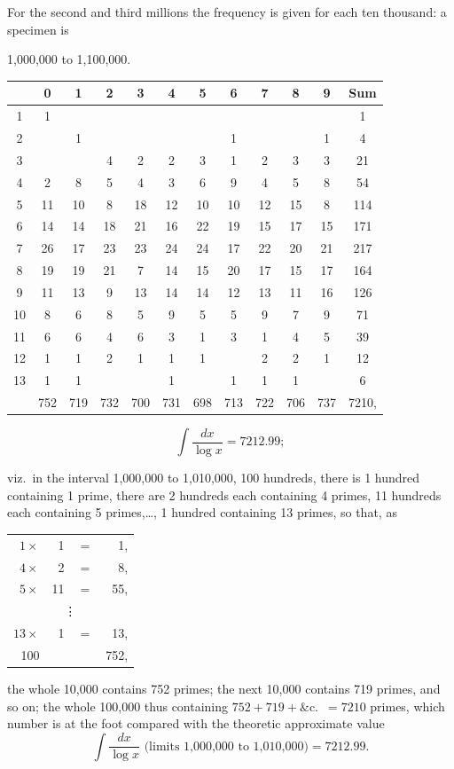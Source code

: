 \documentclass[11pt,a4paper]{article}
\begin{document}
For the second and third millions the frequency is given for each ten thousand: a specimen is
\begin{center}
1,000,000 to 1,100,000.
\end{center}
\begin{small}
\begin{center}
\begin{tabular}{c|cccccccccc|c}
 & 0 & 1 & 2 & 3 & 4 & 5 & 6 & 7 & 8 & 9 & Sum \\
\hline
1 & 1 & & & & & & & & & & 1 \\
2 & & 1 & & & & & 1 & & & 1 & 4 \\
3 & & & 4 & 2 & 2 & 3 & 1 & 2 & 3 & 3 & 21 \\
4 & 2 & 8 & 5 & 4 & 3 & 6 & 9 & 4 & 5 & 8 & 54 \\
5 & 11 & 10 & 8 & 18 & 12 & 10 & 10 & 12 & 15 & 8 & 114 \\
6 & 14 & 14 & 18 & 21 & 16 & 22 & 19 & 15 & 17 & 15 & 171 \\
7 & 26 & 17 & 23 & 23 & 24 & 24 & 17 & 22 & 20 & 21 & 217 \\
8 & 19 & 19 & 21 & 7 & 14 & 15 & 20 & 17 & 15 & 17 & 164 \\
9 & 11 & 13 & 9 & 13 & 14 & 14 & 12 & 13 & 11 & 16 & 126 \\
10 & 8 & 6 & 8 & 5 & 9 & 5 & 5 & 9 & 7 & 9 & 71 \\
11 & 6 & 6 & 4 & 6 & 3 & 1 & 3 & 1 & 4 & 5 & 39 \\
12 & 1 & 1 & 2 & 1 & 1 & 1 & & 2 & 2 & 1 & 12 \\
13 & 1 & 1 & & & 1 & & 1 & 1 & 1 & & 6 \\
\hline
 & 752 & 719 & 732 & 700 & 731 & 698 & 713 & 722 & 706 & 737 & 7210,
\end{tabular}
\end{center}
\[\int\frac{dx}{\log x} = 7212.99;\]
\end{small}

viz.\ in the interval 1,000,000 to 1,010,000, 100 hundreds, there is 1 hundred containing 1 prime, there are 2 hundreds each containing 4 primes, 11 hundreds each containing 5 primes,\ldots, 1 hundred containing 13 primes, so that, as
\begin{center}
\begin{tabular}{r@{\quad}r@{\quad}r@{\quad}r}
$1 \times$ & 1 & $=$ & 1, \\
$4 \times$ & 2 & $=$ & 8, \\
$5 \times$ & 11 & $=$ & 55, \\
\multicolumn{4}{c}{\vdots} \\
$13 \times$ & 1 & $=$ & 13, \\
\hline
100 & & & 752,
\end{tabular}
\end{center}
the whole 10,000 contains 752 primes; the next 10,000 contains 719 primes, and so on; the whole 100,000 thus containing $752 + 719 + \&$c.\ $= 7210$ primes, which number is at the foot compared with the theoretic approximate value
\[\int\frac{dx}{\log x}\text{ (limits 1,000,000 to 1,010,000)} = 7212.99.\]
\end{document}
